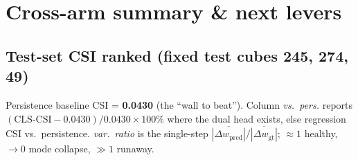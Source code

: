 \section{Cross-arm summary \& next levers}
\label{sec:summary}

\subsection*{Test-set CSI ranked (fixed test cubes 245, 274, 49)}

Persistence baseline CSI = \textbf{0.0430} (the ``wall to beat''). Column
\emph{vs.\ pers.} reports $(\text{CLS-CSI} - 0.0430)/0.0430 \times 100\%$
where the dual head exists, else regression CSI vs.\ persistence.
\emph{var.\ ratio} is the single-step
$\overline{|\Delta w_{\text{pred}}|} / \overline{|\Delta w_{\text{gt}}|}$;
$\approx 1$ healthy, $\to 0$ mode collapse, $\gg 1$ runaway.

